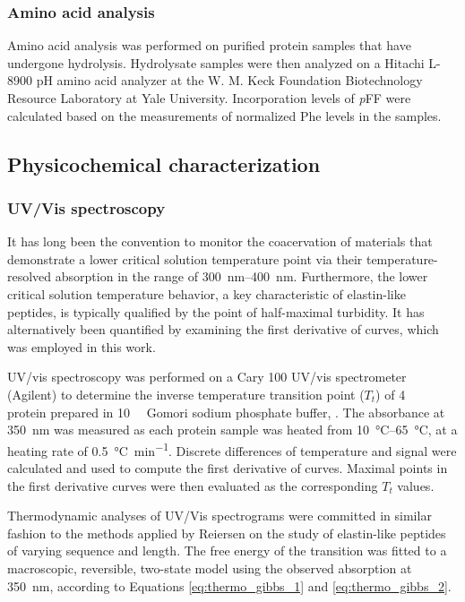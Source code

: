 \begin{refsection}
\subsubsection{Amino acid analysis}

Amino acid analysis was performed on purified protein samples that have
undergone hydrolysis. Hydrolysate samples were then analyzed on a Hitachi L-8900
pH amino acid analyzer at the W. M. Keck Foundation Biotechnology Resource
Laboratory at Yale University. Incorporation levels of \emph{p}FF were calculated based
on the measurements of normalized Phe levels in the samples.

\subsection{Physicochemical characterization}

\subsubsection{UV/Vis spectroscopy}
\label{sec:lcst_method}
It has long been the convention to monitor the coacervation of materials that
demonstrate a lower critical
solution temperature point via their temperature-resolved absorption in the
range of \SIrange{300}{400}{\nm}.\cite{Jamieson1972a} Furthermore, the lower critical solution
temperature behavior, a key characteristic of elastin-like peptides, is
typically qualified by the point of half-maximal turbidity.\cite{Urry1993} It
has alternatively been quantified by examining the first derivative of
curves,\cite{Furgeson2006,Liu2010b,Mackay2010a,Meyer2004} which was employed in
this work.

UV/vis spectroscopy was performed on a Cary 100 UV/vis spectrometer (Agilent) to
determine the inverse temperature transition point ({$T_t$}) of
\SI{4}{\micro\moLar} protein prepared in \SI{10}{\milli\moLar} Gomori sodium
phosphate buffer, . The absorbance at \SI{350}{\nm} was measured as each
protein sample was heated from \SIrange{10}{65}{\celsius}, at a heating rate of
\SI{0.5}{\celsius\per\minute}.\cite{Chilkoti2002a} Discrete differences of
temperature and signal were calculated and used to compute the first derivative
of curves. Maximal points in the first derivative curves were then evaluated as
the corresponding ${T_t}$ values.

\label{sec:thermo_method}
Thermodynamic analyses of UV/Vis spectrograms were committed in similar fashion
to the methods applied by Reiersen on the study of elastin-like peptides of
varying sequence and length.\cite{Reiersen1998} The free energy of the
transition was fitted to a macroscopic, reversible, two-state model using the
observed absorption at \SI{350}{\nm}, according to Equations
\ref{eq:thermo_gibbs_1} and \ref{eq:thermo_gibbs_2}.


\end{refsection}
